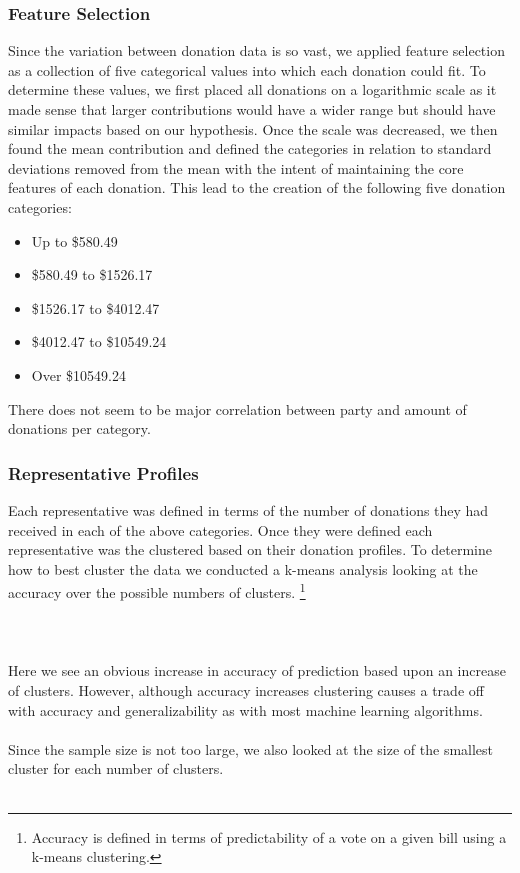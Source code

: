 \documentclass[journal]{IEEEtran}
\begin{document}
 \subsubsection{Feature Selection} 
 Since the variation between donation data is so vast, we applied feature selection as a collection of five
 categorical values into which each donation could fit. To determine these values, we first placed all donations on a logarithmic scale
 as it made sense that larger contributions would have a wider range but should have similar impacts based on our hypothesis. Once
 the scale was decreased, we then found the mean contribution and defined the categories in relation to standard deviations removed 
 from the mean with the intent of maintaining the core features of each donation. This lead to the creation of the following five 
 donation categories:
 \begin{itemize}
  \item Up to \$580.49
  \item \$580.49 to \$1526.17
  \item \$1526.17 to \$4012.47
  \item \$4012.47 to \$10549.24
  \item Over \$10549.24
 \end{itemize}
 There does not seem to be major correlation between party and amount of donations per category\footnotemark.\\
\subsubsection{Representative Profiles}
Each representative was defined in terms of the number of donations they had received in each of the above
categories. Once they were defined each representative was the clustered based on their donation profiles.
To determine how to best cluster the data we conducted a k-means analysis looking at the accuracy over the 
possible numbers of clusters.
\footnote{Accuracy is defined in terms of predictability of a vote on a given bill using a k-means clustering.}\\\\
\\
\\Here we see an obvious increase in accuracy of prediction based upon an increase of clusters. However, although accuracy increases
clustering causes a trade off with accuracy and generalizability as with most machine learning algorithms.\\\\
Since the sample size is not too large, we also looked at the size of the smallest cluster for each number of clusters.\\
\\
\end{document}
